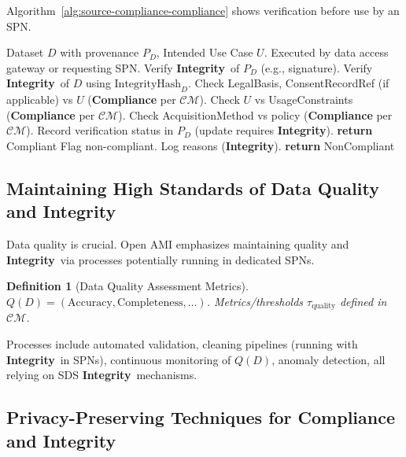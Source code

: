 \documentclass[12pt,a4paper]{report}
\newtheorem{definition}{Definition}[section]
\newcommand{\Integrity}{\textbf{Integrity}}
\begin{document}
	Algorithm~\ref{alg:source-compliance-compliance} shows verification before use by an SPN.
	
	\begin{algorithm}[H]
		\caption{Data Source Compliance Verification}
		\label{alg:source-compliance-compliance}
		\begin{algorithmic}[1]
			\Require Dataset $D$ with provenance $P_D$, Intended Use Case $U$. Executed by data access gateway or requesting SPN.
			\State Verify \Integrity\ of $P_D$ (e.g., signature).
			\State Verify \Integrity\ of $D$ using $\text{IntegrityHash}_D$.
			\State Check LegalBasis, ConsentRecordRef (if applicable) vs $U$ (\textbf{Compliance} per $\mathcal{CM}$).
			\State Check $U$ vs UsageConstraints (\textbf{Compliance} per $\mathcal{CM}$).
			\State Check AcquisitionMethod vs policy (\textbf{Compliance} per $\mathcal{CM}$).
			\State Record verification status in $P_D$ (update requires \Integrity). \textbf{return} Compliant
			\Else
			\State Flag non-compliant. Log reasons (\Integrity). \textbf{return} NonCompliant
			\EndIf
		\end{algorithmic}
	\end{algorithm}
	
	\subsection{Maintaining High Standards of Data Quality and Integrity} %
	\label{sec:5-5-2} %
	
	Data quality is crucial. Open AMI emphasizes maintaining quality and \Integrity\ via processes potentially running in dedicated SPNs.
	\begin{definition}[Data Quality Assessment Metrics]
		\label{def:data-quality-compliance}
		$Q(D) = (\text{Accuracy}, \text{Completeness}, \dots)$. Metrics/thresholds $\tau_{\text{quality}}$ defined in $\mathcal{CM}$.
	\end{definition}
	Processes include automated validation, cleaning pipelines (running with \Integrity\ in SPNs), continuous monitoring of $Q(D)$, anomaly detection, all relying on SDS \Integrity\ mechanisms.
	
	\subsection{Privacy-Preserving Techniques for Compliance and Integrity} %
	\label{sec:5-5-3} %
	
\end{document}
